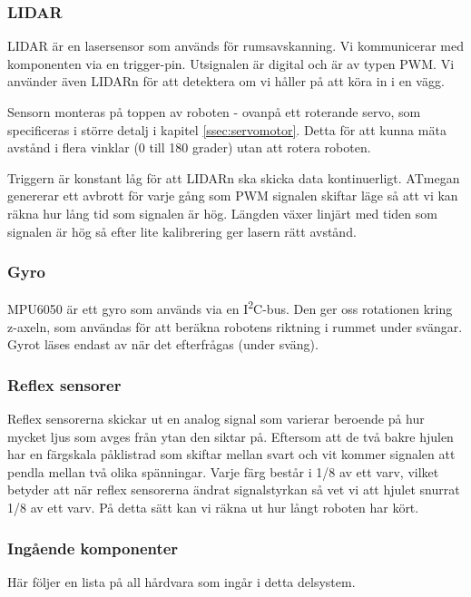 \documentclass[a4paper,11pt]{article}
\begin{document}
\subsubsection{LIDAR} \label{sssec:lidar}
LIDAR är en lasersensor som används för rumsavskanning. Vi kommunicerar med komponenten via en trigger-pin. Utsignalen är digital och är av typen PWM. Vi använder även LIDARn för att detektera om vi håller på att köra in i en vägg.

Sensorn monteras på toppen av roboten - ovanpå ett roterande servo, som specificeras i större detalj i kapitel \ref{ssec:servomotor}. Detta för att kunna mäta avstånd i flera vinklar (0 till 180 grader) utan att rotera roboten.

Triggern är konstant låg för att LIDARn ska skicka data kontinuerligt. ATmegan genererar ett avbrott för varje gång som PWM signalen skiftar läge så att vi kan räkna hur lång tid som signalen är hög. Längden växer linjärt med tiden som signalen är hög så efter lite kalibrering ger lasern rätt avstånd.

\subsubsection{Gyro} \label{sssec:imu}
MPU6050 är ett gyro som används via en I\textsuperscript{2}C-bus. Den ger oss rotationen kring z-axeln, som användas för att beräkna robotens riktning i rummet under svängar. Gyrot läses endast av när det efterfrågas (under sväng).

\subsubsection{Reflex sensorer}
Reflex sensorerna skickar ut en analog signal som varierar beroende på hur mycket ljus som avges från ytan den siktar på. Eftersom att de två bakre hjulen har en färgskala påklistrad som skiftar mellan svart och vit kommer signalen att pendla mellan två olika spänningar. Varje färg består i 1/8 av ett varv, vilket betyder att när reflex sensorerna ändrat signalstyrkan så vet vi att hjulet snurrat 1/8 av ett varv. På detta sätt kan vi räkna ut hur långt roboten har kört.

\subsubsection{Ingående komponenter}
Här följer en lista på all hårdvara som ingår i detta delsystem.
\end{document}
